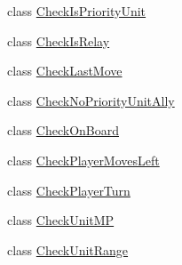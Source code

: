 \begin{DoxyCompactItemize}
\item 
class \mbox{\hyperlink{classrule_engine_1_1rules_1_1atomic_rules_1_1_check_is_priority_unit}{Check\+Is\+Priority\+Unit}}
\item 
class \mbox{\hyperlink{classrule_engine_1_1rules_1_1atomic_rules_1_1_check_is_relay}{Check\+Is\+Relay}}
\item 
class \mbox{\hyperlink{classrule_engine_1_1rules_1_1atomic_rules_1_1_check_last_move}{Check\+Last\+Move}}
\item 
class \mbox{\hyperlink{classrule_engine_1_1rules_1_1atomic_rules_1_1_check_no_priority_unit_ally}{Check\+No\+Priority\+Unit\+Ally}}
\item 
class \mbox{\hyperlink{classrule_engine_1_1rules_1_1atomic_rules_1_1_check_on_board}{Check\+On\+Board}}
\item 
class \mbox{\hyperlink{classrule_engine_1_1rules_1_1atomic_rules_1_1_check_player_moves_left}{Check\+Player\+Moves\+Left}}
\item 
class \mbox{\hyperlink{classrule_engine_1_1rules_1_1atomic_rules_1_1_check_player_turn}{Check\+Player\+Turn}}
\item 
class \mbox{\hyperlink{classrule_engine_1_1rules_1_1atomic_rules_1_1_check_unit_m_p}{Check\+Unit\+MP}}
\item 
class \mbox{\hyperlink{classrule_engine_1_1rules_1_1atomic_rules_1_1_check_unit_range}{Check\+Unit\+Range}}
\end{DoxyCompactItemize}
